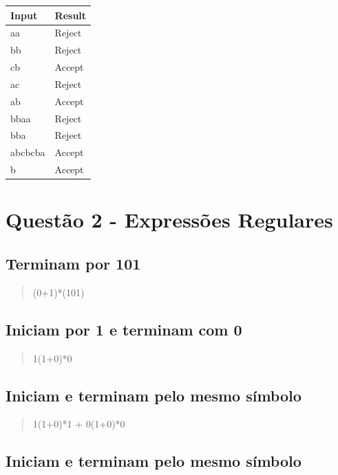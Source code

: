 \documentclass[11pt]{article}
\begin{document}
\begin{center}
\begin{tabular}{ll}
Input & Result\\
\hline
aa & Reject\\
bb & Reject\\
cb & Accept\\
ac & Reject\\
ab & Accept\\
bbaa & Reject\\
bba & Reject\\
abcbcba & Accept\\
b & Accept\\
\end{tabular}
\end{center}
\section{Questão 2 - Expressões Regulares}
\label{sec:org4abe083}

\subsection{Terminam por 101}
\label{sec:orgffd18cf}

\begin{quote}
(0+1)*(101)
\end{quote}

\subsection{Iniciam por 1 e terminam com 0}
\label{sec:org7ca41af}

\begin{quote}
1(1+0)*0 
\end{quote}

\subsection{Iniciam e terminam pelo mesmo símbolo}
\label{sec:org1202bd9}

\begin{quote}
1(1+0)*1 + 0(1+0)*0 
\end{quote}

\subsection{Iniciam e terminam pelo mesmo símbolo}
\label{sec:orgd366c8c}
\end{document}
